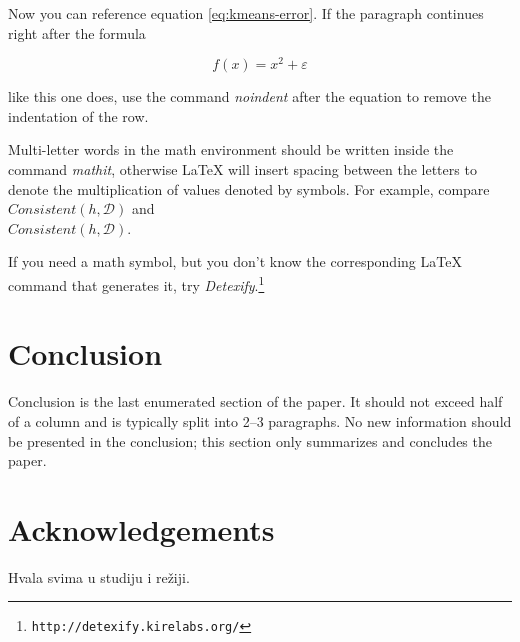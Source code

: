 \documentclass[10pt, a4paper]{article}
\begin{document}
Now you can reference equation \eqref{eq:kmeans-error}. If the paragraph continues right after the formula

\begin{equation}
f(x) = x^2 + \varepsilon
\end{equation}

\noindent like this one does, use the command \emph{noindent} after the equation to remove the indentation of the row. 

Multi-letter words in the math environment should be written inside the command \emph{mathit}, otherwise \LaTeX{} will insert spacing between the letters to denote the multiplication of values denoted by symbols. For example, compare
$\mathit{Consistent}(h,\mathcal{D})$ and\\
$Consistent(h,\mathcal{D})$.

If you need a math symbol, but you don't know the corresponding \LaTeX{} command that generates it, try
\emph{Detexify}.\footnote{\texttt{http://detexify.kirelabs.org/}}

\section{Conclusion}

Conclusion is the last enumerated section of the paper. It should not exceed half of a column and is typically split into 2--3 paragraphs. No new information should be presented in the conclusion; this section only summarizes and concludes the paper.

\section*{Acknowledgements}

Hvala svima u studiju i režiji.


 
\end{document}
